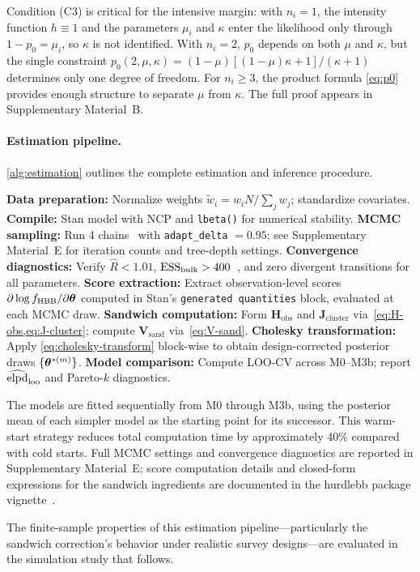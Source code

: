 Condition (C3) is critical for the intensive margin: with $n_i = 1$, the
intensity function $h \equiv 1$ and the parameters $\mu_i$ and $\kappa$
enter the likelihood only through $1 - p_0 = \mu_i$, so $\kappa$ is not
identified. With $n_i = 2$, $p_0$ depends on both $\mu$ and $\kappa$, but the
single constraint $p_0(2,\mu,\kappa) = (1-\mu)[(1-\mu)\kappa+1]/(\kappa+1)$ determines
only one degree of freedom. For $n_i \ge 3$, the product formula
\eqref{eq:p0} provides enough structure to separate $\mu$ from $\kappa$. The
full proof appears in Supplementary Material~B.

\paragraph{Estimation pipeline.}
\cref{alg:estimation} outlines the complete estimation and inference procedure.

\begin{algorithm}[ht]
\caption{Estimation pipeline for the HBB model}\label{alg:estimation}
\begin{algorithmic}[1]
  \State \textbf{Data preparation:} Normalize weights
    $\tilde{w}_i = w_i N / \textstyle\sum_j w_j$; standardize covariates.
  \State \textbf{Compile:} Stan model with NCP and \texttt{lbeta()} for numerical
    stability.
  \State \textbf{MCMC sampling:} Run 4 chains~\citep[NUTS;][]{Hoffman2014}
    with \texttt{adapt\_delta} $= 0.95$; see Supplementary Material~E for
    iteration counts and tree-depth settings.
  \State \textbf{Convergence diagnostics:} Verify $\hat{R} < 1.01$,
    $\text{ESS}_{\mathrm{bulk}} > 400$~\citep{Vehtari2021}, and zero divergent transitions for all
    parameters.
  \State \textbf{Score extraction:} Extract observation-level scores
    $\partial\log f_{\operatorname{HBB}} / \partial\boldsymbol{\theta}$ computed in Stan's
    \texttt{generated quantities} block, evaluated at each MCMC draw.
  \State \textbf{Sandwich computation:} Form $\mathbf{H}_{\mathrm{obs}}$
    and $\mathbf{J}_{\mathrm{cluster}}$ via~\cref{eq:H-obs,eq:J-cluster};
    compute $\mathbf{V}_{\mathrm{sand}}$ via~\cref{eq:V-sand}.
  \State \textbf{Cholesky transformation:} Apply
    \cref{eq:cholesky-transform} block-wise to obtain design-corrected
    posterior draws $\{\boldsymbol{\theta}^{*(m)}\}$.
  \State \textbf{Model comparison:} Compute LOO-CV
    \citep{VehtariEtAl2017} across M0--M3b; report
    $\widehat{\operatorname{elpd}}_{\mathrm{loo}}$ and Pareto-$k$ diagnostics.
\end{algorithmic}
\end{algorithm}

The models are fitted sequentially from M0 through M3b, using the posterior
mean of each simpler model as the starting point for its successor.
This warm-start strategy reduces total computation time by approximately
40\% compared with cold starts.  Full MCMC settings and convergence diagnostics
are reported in Supplementary Material~E; score computation details and
closed-form expressions for the sandwich ingredients are documented in the
\textsf{hurdlebb} package vignette~\citep{hurdlebb2026}.

The finite-sample properties of this estimation pipeline---particularly
the sandwich correction's behavior under realistic survey designs---are
evaluated in the simulation study that follows.

